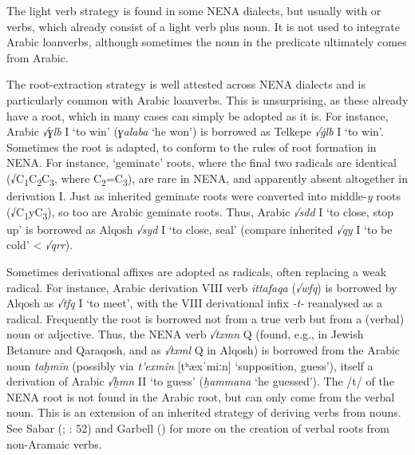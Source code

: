 \documentclass[output=paper]{langsci/langscibook}
\begin{document}
The {light verb} strategy is found in some NENA dialects, but usually with  or  verbs, which already consist of a {light verb} plus noun. It is not used to integrate Arabic loanverbs, although sometimes the noun in the predicate ultimately comes from Arabic.

The root-extraction strategy is well attested across NENA dialects and is particularly common with Arabic loanverbs. This is unsurprising, as these already have a {root}, which in many cases can simply be adopted as it is. For instance, Arabic \textit{√ɣlb} I ‘to win’ (\textit{ɣalaba} ‘he won’) is borrowed as  Telkepe \textit{√\.glb} I ‘to win’. Sometimes the {root} is adapted, to conform to the rules of {root} {formation} in NENA. For instance, ‘geminate’ {roots}, where the final two radicals are identical (√C\textsubscript{1}C\textsubscript{2}C\textsubscript{3}, where C\textsubscript{2}=C\textsubscript{3}), are rare in NENA, and apparently absent altogether in {derivation} I. Just as inherited geminate {roots} were converted into middle-\textit{y} {roots} (√C\textsubscript{1}yC\textsubscript{3}), so too are Arabic geminate {roots}. Thus, Arabic \textit{√sdd} I ‘to close, stop up’ is borrowed as  Alqosh \textit{√syd} I ‘to close, seal’ (compare inherited \textit{√qy{\R}} I ‘to be cold’ < \textit{√qrr}).

Sometimes {derivational} affixes are adopted as radicals, often replacing a weak radical. For instance, Arabic {derivation} VIII verb \textit{ittafaqa} (\textit{√wfq}) is borrowed by  Alqosh as \textit{√tfq} I ‘to meet’, with the VIII {derivational} infix \textit{\nobreakdash-t\nobreakdash-} reanalysed as a radical. Frequently the {root} is borrowed not from a true verb but from a (verbal) noun or adjective. Thus, the NENA verb \textit{√txmn} Q (found, e.g., in Jewish Betanure and  Qaraqosh, and as \textit{√txml} Q in Alqosh) is borrowed from the Arabic noun \textit{taḫmīn} (possibly via  \textit{t’exmîn} [tʰæxˈmiːn] ‘supposition, guess’), itself a {derivation} of Arabic \textit{√ḫmn} II ‘to guess’ (\textit{ḫammana} ‘he guessed’). The /t/ of the NENA {root} is not found in the Arabic {root}, but can only come from the verbal noun. This is an {extension} of an inherited  strategy of deriving verbs from nouns. See Sabar (\citeyear{Sabar1984}; \citeyear{Sabar2002}: 52) and Garbell (\citeyear[166]{Garbell1965}) for more on the creation of verbal {roots} from non-Aramaic verbs.
\end{document}
